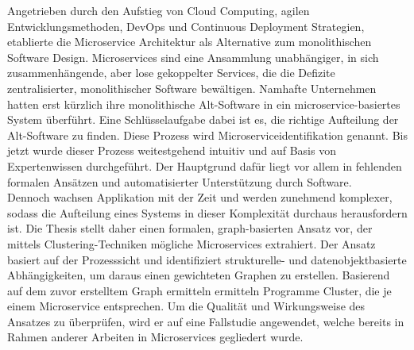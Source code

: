 
\Abstract
Angetrieben durch den Aufstieg von Cloud Computing, agilen Entwicklungsmethoden, DevOps und Continuous Deployment Strategien, etablierte die Microservice Architektur als Alternative zum monolithischen Software Design. Microservices sind eine Ansammlung unabhängiger, in sich zusammenhängende, aber lose gekoppelter Services, die die Defizite zentralisierter, monolithischer Software bewältigen. Namhafte Unternehmen hatten erst kürzlich ihre monolithische Alt-Software in ein microservice-basiertes System überführt. Eine Schlüsselaufgabe dabei ist es, die richtige Aufteilung der Alt-Software zu finden. Diese Prozess wird Microserviceidentifikation genannt. Bis jetzt wurde dieser Prozess weitestgehend intuitiv und auf Basis von Expertenwissen durchgeführt. Der Hauptgrund dafür liegt vor allem in fehlenden formalen Ansätzen und automatisierter Unterstützung durch Software.\\
Dennoch wachsen Applikation mit der Zeit und werden zunehmend komplexer, sodass die Aufteilung eines Systems in dieser Komplexität durchaus herausfordern ist. Die Thesis stellt daher einen formalen, graph-basierten Ansatz vor, der mittels Clustering-Techniken mögliche Microservices extrahiert. Der Ansatz basiert auf der Prozesssicht und identifiziert strukturelle- und datenobjektbasierte Abhängigkeiten, um daraus einen gewichteten Graphen zu erstellen. Basierend auf dem zuvor erstelltem Graph ermitteln ermitteln Programme Cluster, die je einem Microservice entsprechen. Um die Qualität und Wirkungsweise des Ansatzes zu überprüfen, wird er auf eine Fallstudie angewendet, welche bereits in Rahmen anderer Arbeiten in Microservices gegliedert wurde. 
